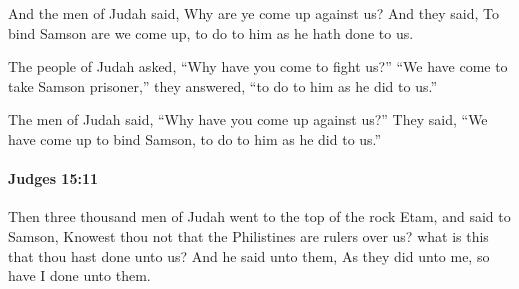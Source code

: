 			\begin{versebox}
					\item[BHS] 
					\item[ASV] And the men of Judah said, Why are ye come up against us? And they said, To bind Samson are we come up, to do to him as he hath done to us.
					\item[NIV] The people of Judah asked, “Why have you come to fight us?” “We have come to take Samson prisoner,” they answered, “to do to him as he did to us.”
					\item[NRSV] The men of Judah said, “Why have you come up against us?” They said, “We have come up to bind Samson, to do to him as he did to us.”
			\end{versebox}

		\paragraph{Judges 15:11} %
			\label{JUDGES-15-11}

			Then three thousand men of Judah went to the top of the rock Etam, and said to Samson, Knowest thou not that the Philistines are rulers over us? what is this that thou hast done unto us? And he said unto them, As they did unto me, so have I done unto them.

